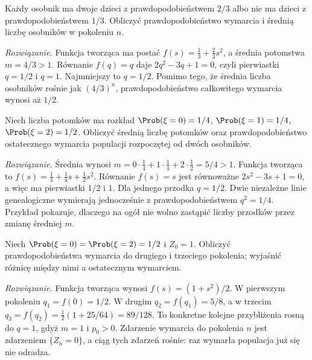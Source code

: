 \begin{zadanie}
Każdy osobnik ma dwoje dzieci z prawdopodobieństwem $2/3$
albo nie ma dzieci z prawdopodobieństwem $1/3$.
Obliczyć prawdopodobieństwo wymarcia i średnią liczbę
osobników w pokoleniu $n$.

\emph{Rozwiązanie.} Funkcja tworząca ma postać
$f(s)=\frac13+\frac23s^2$, a średnia potomstwa
$m=4/3>1$. Równanie $f(q)=q$ daje
$2q^2-3q+1=0$, czyli pierwiastki $q=1/2$ i $q=1$.
Najmniejszy to $q=1/2$. Pomimo tego, że średnia
liczba osobników rośnie jak $(4/3)^n$, prawdopodobieństwo
całkowitego wymarcia wynosi aż $1/2$.
\end{zadanie}


\begin{zadanie}
Niech liczba potomków ma rozkład
$\Prob(\xi=0)=1/4$, $\Prob(\xi=1)=1/4$,
$\Prob(\xi=2)=1/2$. Obliczyć średnią liczbę potomków
oraz prawdopodobieństwo ostatecznego wymarcia populacji
rozpoczętej od dwóch osobników.

\emph{Rozwiązanie.} Średnia wynosi
$m=0\cdot\tfrac14+1\cdot\tfrac14+2\cdot\tfrac12=5/4>1$.
Funkcja tworząca to
$f(s)=\tfrac14+\tfrac14s+\tfrac12s^2$. Równanie
$f(s)=s$ jest równoważne $2s^2-3s+1=0$,
a więc ma pierwiastki $1/2$ i $1$. Dla jednego przodka
$q=1/2$. Dwie niezależne linie genealogiczne wymierają
jednocześnie z prawdopodobieństwem $q^2=1/4$.
Przykład pokazuje, dlaczego na ogół nie wolno zastąpić
liczby przodków przez zmianę średniej $m$.
\end{zadanie}


\begin{zadanie}
Niech $\Prob(\xi=0)=\Prob(\xi=2)=1/2$ i $Z_0=1$.
Obliczyć prawdopodobieństwa wymarcia do drugiego i trzeciego
pokolenia; wyjaśnić różnicę między nimi a ostatecznym wymarciem.

\emph{Rozwiązanie.} Funkcja tworząca wynosi
$f(s)=(1+s^2)/2$. W pierwszym pokoleniu
$q_1=f(0)=1/2$. W drugim $q_2=f(q_1)=5/8$,
a w trzecim $q_3=f(q_2)=\tfrac12(1+25/64)=89/128$.
To konkretne kolejne przybliżenia rosną do $q=1$,
gdyż $m=1$ i $p_0>0$. Zdarzenie wymarcia do pokolenia
$n$ jest zdarzeniem $\{Z_n=0\}$, a ciąg tych zdarzeń
rośnie: raz wymarła populacja już się nie odradza.
\end{zadanie}

